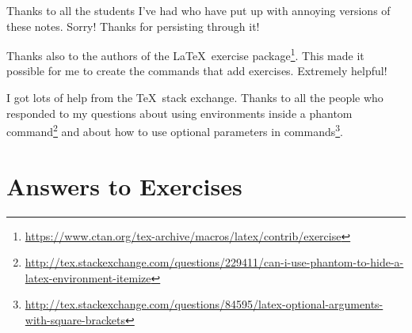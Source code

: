 \documentclass{article}
\begin{document}
Thanks to all the students I've had who have put up with annoying versions of these notes.  Sorry!  Thanks for persisting through it!

Thanks also to the authors of the \LaTeX\ exercise package\footnote{\url{https://www.ctan.org/tex-archive/macros/latex/contrib/exercise}}.  This made it possible for me to create the commands that add exercises.  Extremely helpful!

I got lots of help from the \TeX\ stack exchange.  Thanks to all the people who responded to my questions about using environments inside  a phantom command\footnote{\url{http://tex.stackexchange.com/questions/229411/can-i-use-phantom-to-hide-a-latex-environment-itemize}} and about how to use optional parameters in commands\footnote{\url{http://tex.stackexchange.com/questions/84595/latex-optional-arguments-with-square-brackets}}.


\appendix

\section{Answers to Exercises}

\shipoutAnswer
\end{document}
